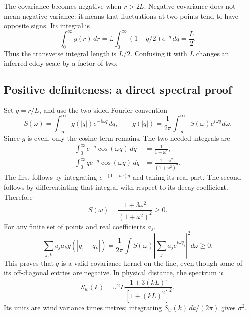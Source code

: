 The covariance becomes negative when $r>2L$. Negative covariance does not mean negative variance: it means that fluctuations at two points tend to have opposite signs. Its integral is
\begin{equation}
 \int_0^\infty g(r)\,dr=L\int_0^\infty (1-q/2)e^{-q}\,dq=\frac L2.
\end{equation}
Thus the transverse integral length is $L/2$. Confusing it with $L$ changes an inferred eddy scale by a factor of two.

\subsection{Positive definiteness: a direct spectral proof}
Set $q=r/L$, and use the two-sided Fourier convention
\begin{equation}
 S(\omega)=\int_{-\infty}^{\infty}g(|q|)e^{-i\omega q}\,dq,
 \qquad g(|q|)=\frac1{2\pi}\int_{-\infty}^{\infty}S(\omega)e^{i\omega q}\,d\omega.
\end{equation}
Since $g$ is even, only the cosine term remains. The two needed integrals are
\begin{align}
 \int_0^\infty e^{-q}\cos(\omega q)\,dq&=\frac1{1+\omega^2},\\
 \int_0^\infty q e^{-q}\cos(\omega q)\,dq&=\frac{1-\omega^2}{(1+\omega^2)^2}.
\end{align}
The first follows by integrating $e^{-(1-i\omega)q}$ and taking its real part. The second follows by differentiating that integral with respect to its decay coefficient. Therefore
\begin{equation}
 \boxed{S(\omega)=\frac{1+3\omega^2}{(1+\omega^2)^2}\geq0.}
\end{equation}
For any finite set of points and real coefficients $a_j$,
\begin{equation}
 \sum_{j,k}a_j a_k g(|q_j-q_k|)
 =\frac1{2\pi}\int S(\omega)\left|\sum_j a_j e^{i\omega q_j}\right|^2 d\omega\geq0.
\end{equation}
This proves that $g$ is a valid covariance kernel on the line, even though some of its off-diagonal entries are negative. In physical distance, the spectrum is
\begin{equation}
 S_w(k)=\sigma^2 L\frac{1+3(kL)^2}{[1+(kL)^2]^2}.
\end{equation}
Its units are wind variance times metres; integrating $S_w(k)\,dk/(2\pi)$ gives $\sigma^2$.

